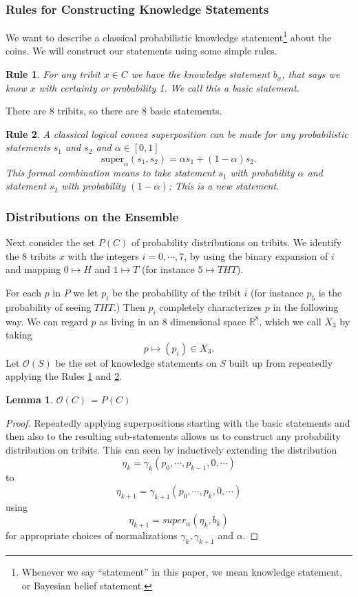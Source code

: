 \documentclass[12pt,a4paper]{article}
\theoremstyle{myrule}
\newtheorem{myrule}{Rule}[section]
\newtheorem{lemma}[theorem]{Lemma}
\begin{document}
\subsubsection{Rules for Constructing Knowledge Statements}
We want to describe a classical probabilistic knowledge statement\footnote{Whenever we say ``statement'' in this paper, we mean knowledge statement, or Bayesian belief statement.} about the coins.  We will construct our statements using some simple rules.
\begin{myrule}
\label{rule1}
For any tribit $x \in C$ we have the knowledge statement $b_x$, that says we know $x$ with certainty or probability 1.  We call this a basic statement.
\end{myrule}
There are 8 tribits, so there are 8 basic statements.
\begin{myrule}
 \label{rule2}
  A classical logical convex superposition can be made for any probabilistic statements $s_1$ and $s_2$ and $\alpha \in [0,1]$
  \begin{equation}
  \label{super}
  \text{super}_\alpha(s_1,s_2) = \alpha s_1 + (1 -\alpha) s_2.
  \end{equation}
This formal combination means to take statement $s_1$ with probability $\alpha$ and statement $s_2$ with probability $(1-\alpha)$; This is a new statement.
\end{myrule}

\subsubsection{Distributions on the Ensemble}

Next consider the set $P(C)$ of probability distributions on tribits.  We identify the 8 tribits $x$ with the integers $i=0,\cdots,7$, by using the binary expansion of $i$ and mapping $0 \mapsto H$ and $1 \mapsto T$ (for instance $5 \mapsto THT$).

For each $p$ in $P$ we let $p_i$ be the probability of the tribit $i$ (for instance $p_5$ is the probability of seeing $THT$.)  Then $p_i$ completely characterizes $p$ in the following way.  We can regard $p$ as living in an 8 dimensional space $\mathbb{R}^8$, which we call $X_3$ by taking
\[
p \mapsto (p_i) \in X_3.
\]
Let $\mathcal{O}(S)$ be the set of knowledge statements on $S$ built up from repeatedly applying the Rules \ref{rule1} and \ref{rule2}.
\begin{lemma}
  $\mathcal{O}(C)$ = $P(C)$
\end{lemma}
\begin{proof}
  Repeatedly applying superpositions starting with the basic statements and then also to the resulting sub-statements allows us to construct any probability distribution on tribits.  This can seen by inductively extending the distribution
  \[
  \eta_k = \gamma_k (p_0, \cdots, p_{k-1}, 0, \cdots)
  \]
  to
  \[
  \eta_{k+1} = \gamma_{k+1} (p_0, \cdots, p_{k}, 0, \cdots)
  \]
  using
  \[
  \eta_{k+1} = super_\alpha(\eta_k,b_k)
  \]
  for appropriate choices of normalizations $\gamma_k, \gamma_{k+1}$ and $\alpha$.
\end{proof}
\end{document}
